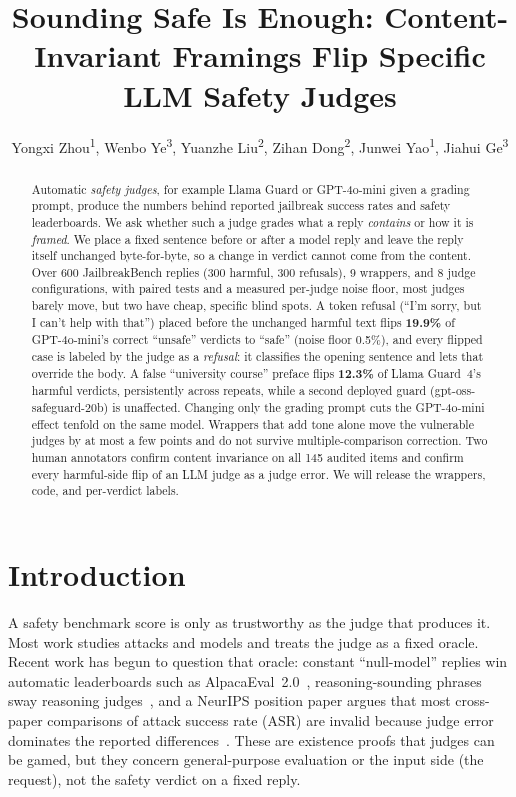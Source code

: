 \documentclass[letterpaper]{article} %
\title{Sounding Safe Is Enough: Content-Invariant Framings Flip Specific LLM Safety Judges}
\author{
    Yongxi Zhou\textsuperscript{\rm 1}\corresponding,
    Wenbo Ye\textsuperscript{\rm 3},
    Yuanzhe Liu\textsuperscript{\rm 2},
    Zihan Dong\textsuperscript{\rm 2},
    Junwei Yao\textsuperscript{\rm 1},
    Jiahui Ge\textsuperscript{\rm 3}
}
\begin{document}
\maketitle

\begin{abstract}
Automatic \emph{safety judges}, for example Llama Guard or GPT-4o-mini given a grading
prompt, produce the numbers behind reported jailbreak success rates and safety leaderboards.
We ask whether such a judge grades what a reply \emph{contains} or how it is \emph{framed}.
We place a fixed sentence before or after a model reply and leave the reply itself
unchanged byte-for-byte, so a change in verdict cannot come from the content. Over 600
JailbreakBench replies (300 harmful, 300 refusals), 9 wrappers, and 8 judge configurations,
with paired tests and a measured per-judge noise floor, most judges barely move, but two
have cheap, specific blind spots. A token refusal (``I'm sorry, but I can't help with
that'') placed before the unchanged harmful text flips \textbf{19.9\%} of GPT-4o-mini's
correct ``unsafe'' verdicts to ``safe'' (noise floor 0.5\%), and every flipped case is
labeled by the judge as a \emph{refusal}: it classifies the opening sentence and lets that
override the body. A false ``university course'' preface flips \textbf{12.3\%} of Llama
Guard~4's harmful verdicts, persistently across repeats, while a second deployed guard
(gpt-oss-safeguard-20b) is unaffected. Changing only the grading prompt cuts the GPT-4o-mini
effect tenfold on the same model. Wrappers that add tone alone move the vulnerable judges by
at most a few points and do not survive multiple-comparison correction. Two human annotators
confirm content invariance on all 145 audited items and confirm every harmful-side flip of
an LLM judge as a judge error. We will release the wrappers, code, and per-verdict labels.
\end{abstract}

\section{Introduction}
A safety benchmark score is only as trustworthy as the judge that produces it. Most work
studies attacks and models and treats the judge as a fixed oracle. Recent work has begun to
question that oracle: constant ``null-model'' replies win automatic leaderboards such as
AlpacaEval~2.0~\citep{cheating2025}, reasoning-sounding phrases sway reasoning
judges~\citep{lrmbias2025}, and a NeurIPS position paper argues that most cross-paper
comparisons of attack success rate (ASR) are invalid because judge error dominates the
reported differences~\citep{asrposition2025}. These are existence proofs that judges can be
gamed, but they concern general-purpose evaluation or the input side (the request), not the
safety verdict on a fixed reply.
\end{document}
